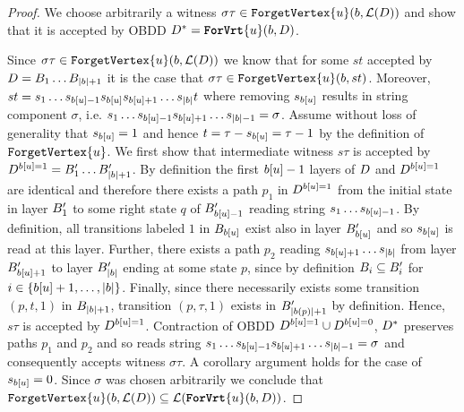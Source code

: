 \begin{proof}
    We choose arbitrarily a  witness $\sigma\tau\in \texttt{ForgetVertex}\{u\}(b,\mathcal{L}(D))$ and show that it is accepted by OBDD $D^* = \texttt{\textbf{ForVrt}}\{u\}(b,D)$.

    Since $\sigma\tau \in \texttt{ForgetVertex}\{u\}(b,\mathcal{L}(D))$ we know that for some $st$ accepted by $D = B_1\dots B_{|b|+1}$ it is the case that $\sigma\tau \in \texttt{ForgetVertex}\{u\}(b,st)$. Moreover, $st = s_1\dots s_{b[u]-1}s_{b[u]}s_{b[u]+1}\dots s_{|b|}t$ where removing $s_{b[u]}$ results in string component $\sigma$, i.e. $s_1\dots s_{b[u]-1} s_{b[u]+1}\dots s_{|b|-1} = \sigma$. Assume without loss of generality that $s_{b[u]} = 1$ and hence $t = \tau - s_{b[u]} = \tau - 1$ by the definition of $\texttt{ForgetVertex}\{u\}$. We first show that intermediate witness $s\tau$ is accepted by $D^{b[u]=1} = B_1'\dots B_{|b|+1}'$. By definition the first $b[u] -1$ layers of $D$ and $D^{b[u]=1}$ are identical and therefore there exists a path $p_1$ in $D^{b[u]=1}$ from the initial state in layer $B'_1$ to some right state $q$ of $B_{b[u]-1}'$ reading string $s_1\dots s_{b[u]-1}$. 
    By definition, all transitions labeled $1$ in $B_{b[u]}$ exist also in layer $B_{b[u]}'$ and so $s_{b[u]}$ is read at this layer. Further, there exists a path $p_2$ reading $s_{b[u]+1}\dots s_{|b|}$ from layer $B_{b[u]+1}'$ to layer $B_{|b|}'$ ending at some state $p$, since by definition $B_i \subseteq B_i'$ for $i \in \{b[u]+1,\ldots,|b|\}$. Finally, since there necessarily exists some transition $(p,t,1)$ in $B_{|b|+1}$, transition $(p,\tau,1)$ exists in $B_{|b(p)|+1}'$ by definition. Hence, $s\tau$ is accepted by $D^{b[u]=1}$. Contraction of OBDD $D^{b[u]=1} \cup D^{b[u]=0}$, $D^*$ preserves paths $p_1$ and $p_2$ and so reads string $s_1\dots s_{b[u]-1} s_{b[u]+1}\dots s_{|b|-1} = \sigma$ and consequently accepts witness $\sigma\tau$. A corollary argument holds for the case of $s_{b[u]} = 0$. Since $\sigma$ was chosen arbitrarily we conclude that $\texttt{ForgetVertex}\{u\}(b,\mathcal{L}(D)) \subseteq \mathcal{L}(\texttt{\textbf{ForVrt}}\{u\}(b,D))$.


\end{proof}
